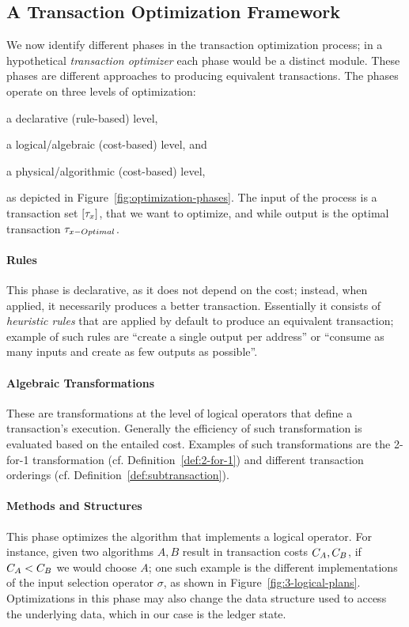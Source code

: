 \subsection{A Transaction Optimization Framework}\label{sec:tx_optimization_framework}

We now identify different phases in the transaction optimization process; in
a hypothetical \emph{transaction optimizer} each phase would be a distinct
module. These phases are different approaches to producing equivalent
transactions. The phases operate on three levels of optimization:
\begin{inparaenum}[a)]
    \item a declarative (rule-based) level,
    \item a logical/algebraic (cost-based) level, and
    \item a physical/algorithmic (cost-based) level,
\end{inparaenum}
as depicted in Figure~\ref{fig:optimization-phases}. The input of the process
is a transaction set $[\tau_x]$, that we want to optimize, and while output is the
optimal transaction $\tau_{x-Optimal}$.

\paragraph{Rules}
This phase is declarative, as it does not depend on the cost; instead, when
applied, it necessarily produces a better transaction. Essentially it consists
of \emph{heuristic rules} that are applied by default to produce an equivalent
transaction; example of such rules are ``create a single output per address''
or ``consume as many inputs and create as few outputs as possible''.

\paragraph{Algebraic Transformations}
These are transformations at the level of logical operators that define a
transaction's execution. Generally the efficiency of such transformation is
evaluated based on the entailed cost. Examples of such transformations are the
2-for-1 transformation (cf. Definition~\ref{def:2-for-1}) and different
transaction orderings (cf. Definition~\ref{def:subtransaction}).

\paragraph{Methods and Structures}
This phase optimizes the algorithm that implements a logical operator. For
instance, given two algorithms $A, B$ result in transaction costs $C_A, C_B$,
if $C_A < C_B$ we would choose $A$; one such example is the different
implementations of the input selection operator $\sigma$, as shown in
Figure~\ref{fig:3-logical-plans}. Optimizations in this phase may also change
the data structure used to access the underlying data, which in our case is the
ledger state.


